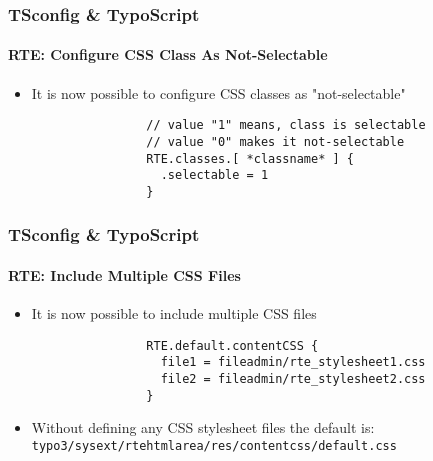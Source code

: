 
\begin{frame}[fragile]
	\frametitle{TSconfig \& TypoScript}
	\framesubtitle{RTE: Configure CSS Class As Not-Selectable}

	\begin{itemize}
		\item It is now possible to configure CSS classes as "not-selectable"

			\begin{lstlisting}
				// value "1" means, class is selectable
				// value "0" makes it not-selectable
				RTE.classes.[ *classname* ] {
				  .selectable = 1
				}
			\end{lstlisting}

	\end{itemize}

\end{frame}


\begin{frame}[fragile]
	\frametitle{TSconfig \& TypoScript}
	\framesubtitle{RTE: Include Multiple CSS Files}

	\begin{itemize}
		\item It is now possible to include multiple CSS files

			\begin{lstlisting}
				RTE.default.contentCSS {
				  file1 = fileadmin/rte_stylesheet1.css
				  file2 = fileadmin/rte_stylesheet2.css
				}
			\end{lstlisting}

		\item Without defining any CSS stylesheet files the default is:\newline
			\texttt{typo3/sysext/rtehtmlarea/res/contentcss/default.css}

	\end{itemize}

\end{frame}

